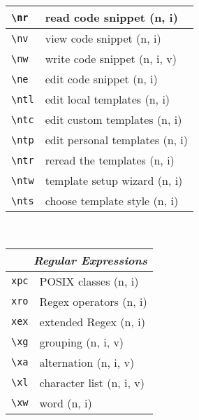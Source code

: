 \documentclass[oneside,10pt,landscape,DIV16]{scrartcl}
\begin{document}
\begin{multicols}{3}
\begin{center}
\begin{tabular}[]{|p{11mm}|p{60mm}|}
\hline \verb'\nr'  & read code snippet         \hfill (n, i)   \\
\hline \verb'\nv'  & view code snippet         \hfill (n, i)   \\
\hline \verb'\nw'  & write code snippet        \hfill (n, i, v)\\
\hline \verb'\ne'  & edit code snippet         \hfill (n, i)   \\
%
\hline     \verb'\ntl' & edit local templates      \hfill (n, i)\\
\hline     \verb'\ntc' & edit custom templates     \hfill (n, i)\\
\hline     \verb'\ntp' & edit personal templates   \hfill (n, i)\\
\hline     \verb'\ntr' & reread the templates      \hfill (n, i)\\
\hline     \verb'\ntw' & template setup wizard     \hfill (n, i)\\
\hline     \verb'\nts' & choose template style     \hfill (n, i)\\
\hline
%
\end{tabular}\\
%
%
\begin{tabular}[]{|p{11mm}|p{62mm}|}
\hline
\multicolumn{2}{|r|}{\textsl{Regular E\textbf{x}pressions}}     \\[1.0ex]
\hline     \verb'xpc' &  POSIX classes                 \hfill (n, i)\\ 
\hline     \verb'xro' &  Regex operators               \hfill (n, i)\\ 
\hline     \verb'xex' &  extended Regex                \hfill (n, i)\\ 
\hline     \verb'\xg' &  grouping                      \hfill (n, i, v)   \\
\hline     \verb'\xa' &  alternation                   \hfill (n, i, v)   \\
\hline     \verb'\xl' &  character list                \hfill (n, i, v)   \\
\hline     \verb'\xw' &  word                          \hfill (n, i)   \\
\hline

\end{tabular}
\end{center}
\end{multicols}
\end{document}
